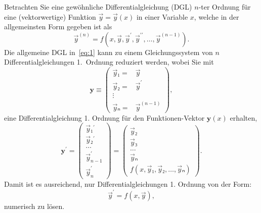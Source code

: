 
\NewDocumentCommand{}
\date{Ausgabe: Fr, 12.07.2019, Abgabe: Do, 18.07.2019, 18:00 Uhr}
\setcounter{question}{0}


\maketitle

Betrachten Sie eine gewöhnliche Differentialgleichung (DGL) $n$-ter Ordnung für eine (vektorwertige) Funktion $\vec{y} = \vec{y}(x)$ in einer Variable $x$, welche in der allgemeinsten Form gegeben ist als
\begin{equation}
  \label{eq:1}
  \vec{y}^{(n)} = f(x, \vec{y}, \vec{y}^\prime, \vec{y}^{\prime\prime}, …, \vec{y}^{(n - 1)}).
\end{equation}
Die allgemeine DGL in~\eqref{eq:1} kann zu einem Gleichungssystem von $n$ Differentialgleichungen 1.~Ordnung reduziert werden, wobei Sie mit
\begin{equation}
  \label{eq:2}
  \symbf{y} ≡ \begin{pmatrix}
    \vec{y}₁ = & \vec{y}\\
    \vec{y}₂ = & \vec{y}^\prime\\
    \vdots & \\
    \vec{y}ₙ = & \vec{y}^{(n - 1)}
  \end{pmatrix},
\end{equation}
eine Differentialgleichung 1. Ordnung für den Funktionen-Vektor $\symbf{y}(x)$ erhalten,
\begin{equation}
  \label{eq:3}
  \symbf{y}^{\prime} = \begin{pmatrix}
    \vec{y}₁^\prime \\
    \vec{y}₂^\prime \\
    … \\
    \vec{y}_{n - 1}^\prime \\
    \vec{y}_n^\prime
  \end{pmatrix}
  =
  \begin{pmatrix}
    \vec{y}₂\\
    \vec{y}₃\\
    … \\
    \vec{y}ₙ\\
    f(x, \vec{y}₁, \vec{y}₂, …, \vec{y}ₙ)
  \end{pmatrix}.
\end{equation}
Damit ist es ausreichend, nur Differentialgleichungen 1. Ordnung von der Form:
\begin{equation}
  \label{eq:3}
  \vec{y}^\prime = f(x, \vec{y}),
\end{equation}
numerisch zu lösen.


